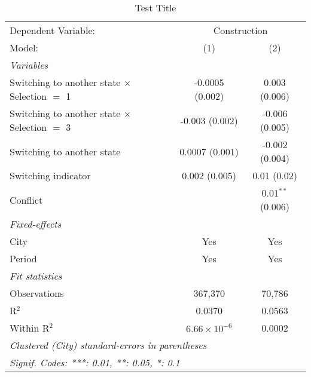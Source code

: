 \begin{table}[htbp]
   \caption{Test Title}
   \centering
   \begin{tabular}{lcc}
      \tabularnewline \midrule \midrule
      Dependent Variable: & \multicolumn{2}{c}{Construction}\\
      Model:                                               & (1)                   & (2)\\  
      \midrule
      \emph{Variables}\\
      Switching to another state $\times$ Selection $=$ 1  & -0.0005 (0.002)       & 0.003 (0.006)\\   
      Switching to another state $\times$ Selection $=$ 3  & -0.003 (0.002)        & -0.006 (0.005)\\   
      Switching to another state                           & 0.0007 (0.001)        & -0.002 (0.004)\\   
      Switching indicator                                  & 0.002 (0.005)         & 0.01 (0.02)\\   
      Conflict                                             &                       & 0.01$^{**}$ (0.006)\\   
      \midrule
      \emph{Fixed-effects}\\
      City                                                 & Yes                   & Yes\\  
      Period                                               & Yes                   & Yes\\  
      \midrule
      \emph{Fit statistics}\\
      Observations                                         & 367,370               & 70,786\\  
      R$^2$                                                & 0.0370                & 0.0563\\  
      Within R$^2$                                         & $6.66\times 10^{-6}$  & 0.0002\\  
      \midrule \midrule
      \multicolumn{3}{l}{\emph{Clustered (City) standard-errors in parentheses}}\\
      \multicolumn{3}{l}{\emph{Signif. Codes: ***: 0.01, **: 0.05, *: 0.1}}\\
   \end{tabular}
\end{table}
